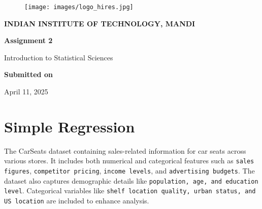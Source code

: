 \documentclass[12pt]{article}
\begin{document}
\begin{figure}
  \centering
  \texttt{[image: images/logo\_hires.jpg]}
  \vspace*{-0.3cm}
\end{figure}

\begin{center}
{\large \rm \textbf {INDIAN INSTITUTE OF TECHNOLOGY, MANDI} \linebreak}
\end{center}

\baselineskip 30pt

\vspace*{0.3cm}

\begin{center}
{\LARGE \bfseries Assignment 2}
\end{center}

\setcounter{footnote}{1}

\renewcommand{\thefootnote}{\fnsymbol{footnote}}
\begin{center}
{Introduction to Statistical Sciences
\\}
\vspace*{0.6cm}

 \vspace*{-.5cm} 
\end{center}

\setcounter{footnote}{1}

\vspace*{2.8cm}


\baselineskip 17pt

\vspace*{1.5cm}
\begin{center}
{{\bf Submitted on\par{April 11, 2025}}}
\end{center}

\vspace*{.05cm}


\renewcommand{\thefootnote}{\arabic{footnote}}

\setcounter{footnote}{1}

\pagebreak

\baselineskip 19pt

\section*{Simple Regression}
The CarSeats dataset containing sales-related information for car seats across various stores. It includes both numerical and categorical features such as \texttt{sales figures}, \texttt{competitor pricing}, \texttt{income levels}, and \texttt{advertising budgets}. The dataset also captures demographic details like \texttt{population, age, and education level}. Categorical variables like \texttt{shelf location quality, urban status, and US location} are included to enhance analysis.
\end{document}
